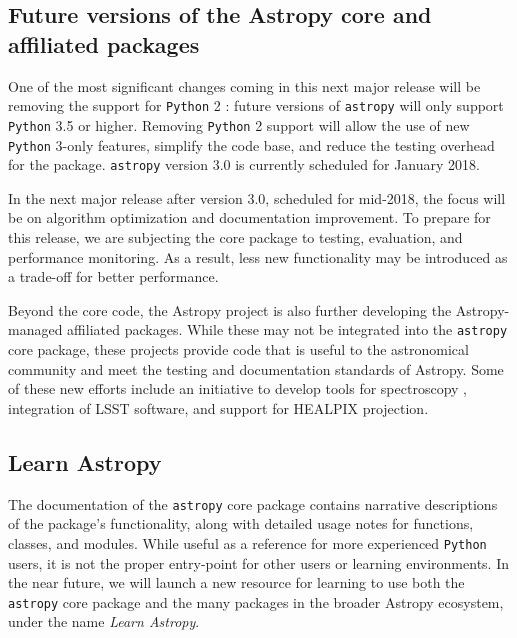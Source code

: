 \documentclass[modern]{aastex61}
\newcommand{\package}[1]{\texttt{#1}\xspace}
\newcommand{\python}{\package{Python}}
\newcommand{\astropy}{Astropy\xspace}
\newcommand{\astropypkg}{\package{astropy}}
\newcommand{\inlinecomment}[2]{\todo[inline]{#1: #2}\xspace}
\begin{document}
\subsection{Future versions of the Astropy core and affiliated packages}

One of the most significant changes coming in this next major release will be
removing the support for \python 2 \citep{ape10}: future versions of \astropypkg
will only support \python 3.5 or higher.
Removing \python 2 support will allow the use of new \python 3-only features,
simplify the code base, and reduce the testing overhead for the package.
\astropypkg version 3.0 is currently scheduled for January 2018.

In the next major release after version 3.0, scheduled for
mid-2018, the focus will be on algorithm optimization and
documentation improvement.
To prepare for this release, we are subjecting the core package to testing,
evaluation, and performance monitoring.
As a result, less new functionality may be introduced as a trade-off for
better performance.

Beyond the core code, the \astropy project is also further developing the
\astropy-managed affiliated packages.
While these may not be integrated into the \astropypkg core package, these
projects provide code that is useful to the astronomical community and meet the
testing and documentation standards of \astropy.
Some of these new efforts include an initiative to develop tools for
spectroscopy \citep[\package{specutils}, \package{specreduc}, \package{specviz}]
{ape13}, integration of LSST software, and support for HEALPIX
projection. %

\subsection{Learn Astropy}

The documentation of the \astropypkg core package contains narrative descriptions of
the package's functionality, along with detailed usage notes for functions,
classes, and modules.
While useful as a reference for more experienced \python users, it is not the
proper entry-point for other users or learning environments.
In the near future, we will launch a new resource for learning to use both the
\astropypkg core package and the many packages in the broader \astropy
ecosystem, under the name \emph{Learn Astropy}.
\end{document}
